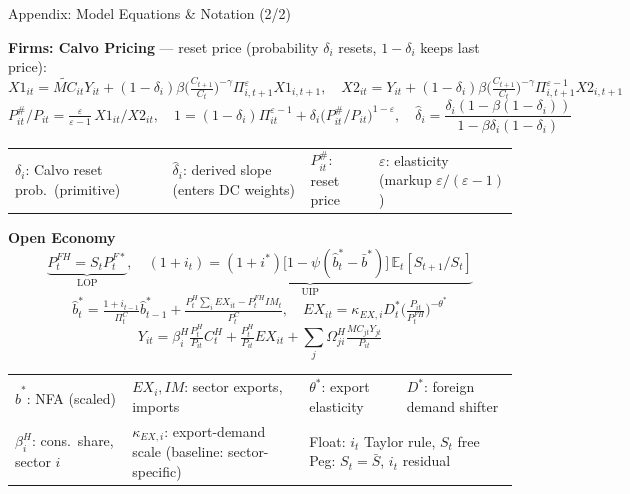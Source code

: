 \begin{frame}{Appendix: Model Equations \& Notation (2/2)}

{\scriptsize \textbf{Firms: Calvo Pricing} --- reset price (probability $\delta_i$ resets, $1{-}\delta_i$ keeps last price):}
\vspace{-4pt}
{\tiny
\[
X1_{it} = \widetilde{MC}_{it}Y_{it} + (1{-}\delta_i)\beta\Big(\tfrac{C_{t+1}}{C_t}\Big)^{-\gamma}\Pi_{i,t+1}^{\varepsilon}X1_{i,t+1},\quad
X2_{it} = Y_{it} + (1{-}\delta_i)\beta\Big(\tfrac{C_{t+1}}{C_t}\Big)^{-\gamma}\Pi_{i,t+1}^{\varepsilon-1}X2_{i,t+1}
\]
\vspace{-8pt}
\[
P_{it}^\#/P_{it} = \tfrac{\varepsilon}{\varepsilon-1}\,X1_{it}/X2_{it},\quad
1 = (1{-}\delta_i)\Pi_{it}^{\varepsilon-1} + \delta_i \big(P_{it}^\#/P_{it}\big)^{1-\varepsilon},\quad
\hat\delta_i=\dfrac{\delta_i(1-\beta(1-\delta_i))}{1-\beta\delta_i(1-\delta_i)}
\]}
{\tiny
\begin{tabular}{@{}llll@{}}
$\delta_i$: Calvo reset prob.\ (primitive) & $\hat\delta_i$: derived slope (enters DC weights) & $P_{it}^\#$: reset price & $\varepsilon$: elasticity (markup $\varepsilon/(\varepsilon{-}1)$) \\
\end{tabular}}

\vspace{10pt}
{\scriptsize\textbf{Open Economy}}
\vspace{-2pt}
{\tiny
\[
\underbrace{P^{FH}_t = S_t P^{F*}_t}_{\text{LOP}},\quad
\underbrace{(1{+}i_t) = (1{+}i^*)\big[1{-}\psi(\hat b^*_t{-}\bar b^*)\big]\,\mathbb{E}_t[S_{t+1}/S_t]}_{\text{UIP}}
\]
\vspace{-8pt}
\[
\hat b^*_t = \tfrac{1+i_{t-1}}{\Pi^C_t}\hat b^*_{t-1} + \tfrac{P^H_t\sum_iEX_{it} - P^{FH}_t IM_t}{P^C_t},\quad
EX_{it} = \kappa_{EX,i}D^*_t\Big(\tfrac{P_{it}}{P^{FH}_t}\Big)^{-\theta^*}
\]
\vspace{-8pt}
\[
Y_{it} = \beta^H_i\tfrac{P^H_t}{P_{it}}C^H_t + \tfrac{P^H_t}{P_{it}}EX_{it} + \sum_j \Omega^H_{ji}\tfrac{MC_{jt}Y_{jt}}{P_{it}}
\]}
{\tiny
\begin{tabular}{@{}llll@{}}
$\hat b^*$: NFA (scaled) & $EX_i,IM$: sector exports, imports & $\theta^*$: export elasticity & $D^*$: foreign demand shifter \\
$\beta^H_i$: cons.\ share, sector $i$ & $\kappa_{EX,i}$: export-demand scale (baseline: sector-specific) & \multicolumn{2}{l}{Float: $i_t$ Taylor rule, $S_t$ free \quad Peg: $S_t=\bar S$, $i_t$ residual} \\
\end{tabular}}

\end{frame}

